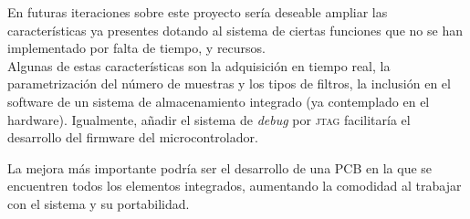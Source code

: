 En futuras iteraciones sobre este proyecto sería deseable ampliar las características ya presentes dotando al sistema de ciertas funciones que no se han implementado por falta de tiempo, y recursos.\\
Algunas de estas características son la adquisición en tiempo real, la parametrización del número de muestras y los tipos de filtros, la inclusión en el software de un sistema de almacenamiento integrado (ya contemplado en el hardware). Igualmente, añadir el sistema de \textit{debug} por \textsc{\acrshort{jtag}} facilitaría el desarrollo del firmware del microcontrolador.

La mejora más importante podría ser el desarrollo de una \acrshort{PCB} en la que se encuentren todos los elementos integrados, aumentando la comodidad al trabajar con el sistema y su portabilidad.


